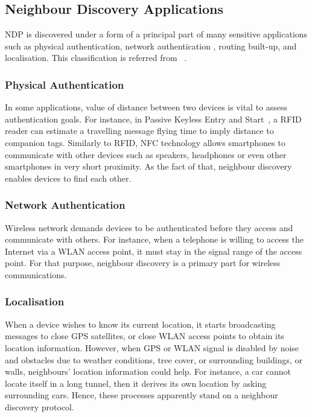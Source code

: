 \subsection{Neighbour Discovery Applications}

NDP is discovered under a form of a principal part of many sensitive applications such as physical authentication, network authentication , routing built-up, and localisation. This classification is referred from ~\cite{Marcinthesis}.

\subsubsection*{Physical Authentication}

In some applications, value of distance between two devices is vital to assess authentication goals. For instance, in Passive Keyless Entry and Start~\cite{waraksa1990passive}, a RFID reader can estimate a travelling message flying time to imply distance to companion tags. Similarly to RFID, NFC technology allows smartphones to communicate with other devices such as speakers, headphones or even other smartphones in very short proximity. As the fact of that, neighbour discovery enables devices to find each other. 

\subsubsection*{Network Authentication}
Wireless network demands devices to be authenticated before they access and communicate with others. For instance, when a telephone is willing to access the Internet via a WLAN access point, it must stay in the signal range of the access point. For that purpose, neighbour discovery is a primary part for wireless communications. 

\subsubsection*{Localisation}

When a device wishes to know its current location, it starts broadcasting messages to close GPS satellites, or close WLAN access points to obtain its location information. However, when GPS or WLAN signal is disabled by noise and obstacles due to weather conditions, tree cover, or surrounding buildings, or walls, neighbours' location information could help. For instance, a car cannot locate itself in a long tunnel, then it derives its own location by asking surrounding cars. Hence, these processes apparently stand on a neighbour discovery protocol.

